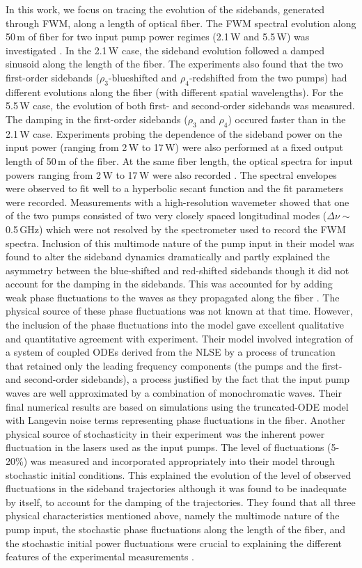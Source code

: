 In this work, we focus on tracing the evolution of the sidebands, generated 
through FWM, along a length of optical fiber. The FWM spectral evolution along
50\,m of fiber for two input pump power regimes (2.1\,W and 5.5\,W) was
investigated \cite{hart1}. In the 2.1\,W case, the sideband evolution followed a damped 
sinusoid along the length of the fiber. The experiments also found that the 
two first-order sidebands ($\rho_3$-blueshifted and $\rho_4$-redshifted from 
the two pumps) had different evolutions along the fiber (with different 
spatial wavelengths). For the 5.5\,W case, the evolution of both first- and 
second-order sidebands was measured. The damping in the first-order sidebands 
($\rho_3$ and $\rho_4$) occured faster than in the 2.1\,W case. Experiments 
probing the dependence of the sideband power on the input power (ranging from 
2\,W to 17\,W) were also performed at a fixed output length of 50\,m of the fiber.
At the same fiber length, the optical spectra for input powers ranging from 
2\,W to 17\,W were also recorded \cite{hart1}. The spectral envelopes were observed to fit 
well to a hyperbolic secant function and the fit parameters were recorded. 
Measurements with a high-resolution wavemeter showed that one of the two pumps 
consisted of two very closely spaced longitudinal modes 
($\Delta\nu\sim$ 0.5\,GHz) which were not resolved by the spectrometer used to 
record the FWM spectra. Inclusion of this multimode nature of the pump input 
in their model was found to alter the sideband dynamics dramatically and 
partly explained the asymmetry between the blue-shifted and red-shifted 
sidebands though it did not account for the damping in the sidebands. This 
was accounted for by adding weak phase fluctuations to the waves as they 
propagated along the fiber \cite{hart1}. The physical source of these phase fluctuations 
was not known at that time. However, the inclusion of the phase fluctuations 
into the model gave excellent qualitative and quantitative agreement with 
experiment. Their model involved integration of a system of coupled ODEs 
derived from the NLSE \cite{thompson1} by a process of truncation that 
retained only the leading frequency components (the pumps and the first- and 
second-order sidebands), a process justified by the fact that the input pump 
waves are well approximated by a combination of monochromatic waves. Their 
final numerical results are based on simulations using the truncated-ODE model
with Langevin noise terms representing phase fluctuations in the fiber. 
Another physical source of stochasticity in their experiment was the inherent 
power fluctuation in the lasers used as the input pumps. The level of 
fluctuations (5-20\%) was measured and incorporated appropriately into their 
model through stochastic initial conditions. This explained the evolution of 
the level of observed fluctuations in the sideband trajectories although it 
was found to be inadequate by itself, to account for the damping of the 
trajectories. They found that all three physical characteristics mentioned 
above, namely the multimode nature of the pump input, the stochastic phase 
fluctuations along the length of the fiber, and the stochastic initial power 
fluctuations were crucial to explaining the different features of the 
experimental measurements \cite{hart1}. 

